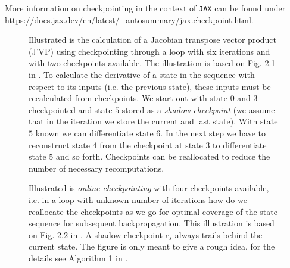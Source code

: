 
More information on checkpointing in the context of \texttt{JAX} can be found under
\url{https://docs.jax.dev/en/latest/\_autosummary/jax.checkpoint.html}.

\begin{figure}[!htb]
 \centering
 \hfill
 \caption{Illustrated is the calculation of a Jacobian transpose vector product (J'VP) using checkpointing
 through a loop with six iterations and with two checkpoints available.
 The illustration is based on Fig. 2.1 in \cite{stumm10}. To calculate
 the derivative of a state in the sequence with respect to its inputs (i.e. the previous state),
 these inputs must be recalculated from checkpoints. We start
 out with state $0$ and $3$ checkpointed and state $5$ stored
 as a \textit{shadow checkpoint} (we assume that in the iteration we store
 the current and last state). With state $5$ known we can differentiate
 state $6$. In the next step we have to reconstruct state
 $4$ from the checkpoint at state $3$ to differentiate state $5$ and so forth.
 Checkpoints can be reallocated to reduce the number of necessary recomputations.
 }
 \label{fig:checkpointed_backprop}
\end{figure}

\begin{figure}[!htb]
 \centering
 \hfill
 \caption{Illustrated is \textit{online checkpointing} with four checkpoints available, i.e.
 in a loop with unknown number of iterations how do we reallocate the checkpoints as we
 go for optimal coverage of the state sequence for subsequent backpropagation. This illustration
 is based on Fig. 2.2 in \cite{stumm10}. A shadow checkpoint $c_s$ always trails behind the current
 state. The figure is only meant to give a rough idea, for the details see Algorithm 1 in
 \cite{stumm10}.}
 \label{fig:online_checkpointing}
\end{figure}

